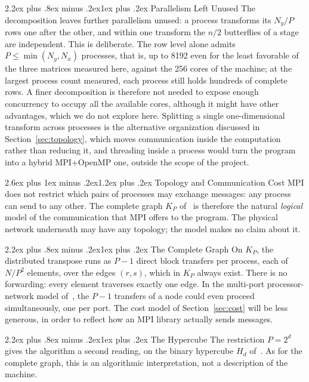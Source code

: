 \documentclass[conference,onecolumn]{IEEEtran}
\makeatletter
\renewcommand{\section}{\@startsection{section}{1}{\z@}%
  {2.6ex plus 1ex minus .2ex}{1.2ex plus .2ex}%
  {\normalfont\large\bfseries}}
\renewcommand{\subsection}{\@startsection{subsection}{2}{\z@}%
  {2.2ex plus .8ex minus .2ex}{1ex plus .2ex}%
  {\normalfont\normalsize\bfseries}}
\theoremstyle{course}
\makeatother
\begin{document}
\subsection{Parallelism Left Unused}
The decomposition leaves further parallelism unused: a process transforms
its $N_y/P$ rows one after the other, and within one transform the $n/2$
butterflies of a stage are independent. This is deliberate. The row level
alone admits $P\le\min(N_y,N_x)$ processes, that is, up to 8192 even for
the least favorable of the three matrices measured here, against the 256
cores of the machine; at the largest process count measured, each process
still holds hundreds of complete rows. A finer decomposition is therefore
not needed to expose enough concurrency to occupy all the available cores,
although it might have other advantages, which we do not explore here.
Splitting a single one-dimensional transform across processes is the
alternative organization discussed in Section~\ref{sec:topology}, which
moves communication inside the computation rather than reducing it, and
threading inside a process would turn the program into a hybrid MPI+OpenMP
one, outside the scope of the project.

\section{Topology and Communication Cost}\label{sec:topology}
MPI does not restrict which pairs of processes may exchange messages: any
process can send to any other. The complete graph $K_P$
of~\cite[sec.~1.1]{arch} is therefore the natural \emph{logical} model of
the communication that MPI offers to the program. The physical network
underneath may have any topology; the model makes no claim about it.

\subsection{The Complete Graph}
On $K_P$, the distributed transpose runs as $P-1$ direct block transfers
per process, each of $N/P^2$ elements, over the edges $(r,s)$, which in
$K_P$ always exist. There is no forwarding: every element traverses exactly
one edge. In the multi-port processor-network model of~\cite[sec.~1]{arch},
the $P-1$ transfers of a node could even proceed simultaneously, one per
port. The cost model of Section~\ref{sec:cost} will be less generous, in
order to reflect how an MPI library actually sends messages.

\subsection{The Hypercube}\label{sec:hcube}
The restriction $P=2^d$ gives the algorithm a second reading, on the binary
hypercube $H_d$ of~\cite[ch.~3]{arch}. As for the complete graph, this is
an algorithmic interpretation, not a description of the machine.
\end{document}
